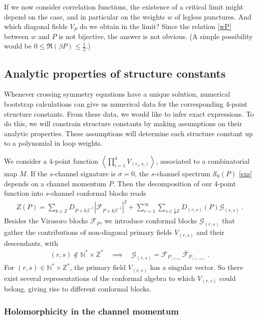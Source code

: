 \documentclass[12pt, a4paper]{article}
\begin{document}
If we now consider correlation functions, the existence of a critical limit might depend on the case, and in particular on the weights $w$ of legless punctures. And which diagonal fields $V_P$ do we obtain in the limit? Since the relation \eqref{wP} between $w$ and $P$ is not bijective, the answer is not obvious. (A simple possibility would be $0\leq \Re(\beta P)\leq \frac12$.) 


\subsection{Analytic properties of structure constants}

Whenever crossing symmetry equations have a unique solution, numerical bootstrap calculations can give us numerical data for the corresponding 4-point structure constants. From these data, we would like to infer exact expressions. To do this, we will constrain structure constants by making assumptions on their analytic properties. These assumptions will determine each structure constant up to a polynomial in loop weights.

We consider a 4-point function $\left<\prod_{i=1}^4 V_{(r_i,s_i)}\right>$, associated to a combinatorial map $M$. If the $s$-channel signature is $\sigma=0$, the $s$-channel spectrum $\mathcal{S}_0(P)$ \eqref{sxs} depends on a channel momentum $P$. Then the decomposition of our 4-point function into $s$-channel conformal blocks reads
\begin{align}
 Z(P) =  \sum_{k\in\mathbb{Z}} D_{P+k\beta^{-1}} \left|\mathcal{F}_{P+k\beta^{-1}}\right|^2 +\sum_{r=1}^\infty \sum_{s\in\frac{1}{r}\mathbb{Z}} D_{(r,s)}(P) \mathcal{G}_{(r,s)}\ .
 \label{zop}
\end{align}
Besides the Virasoro blocks $\mathcal{F}_P$, we introduce conformal blocks $\mathcal{G}_{(r,s)}$ that gather the contributions of non-diagonal primary fields $V_{(r,s)}$ and their descendants, with
\begin{align}
 (r,s)\notin\mathbb{N}^*\times \mathbb{Z}^*\quad \implies\quad \mathcal{G}_{(r,s)} = \mathcal{F}_{P_{(r,s)}}\bar{\mathcal{F}}_{P_{(r,-s)}}\ .
\end{align}
For $(r,s)\in\mathbb{N}^*\times \mathbb{Z}^*$, the primary field $V_{(r,s)}$ has a singular vector. So there exist several representations of the conformal algebra to which $V_{(r,s)}$ could belong, giving rise to different conformal blocks.

\subsubsection{Holomorphicity in the channel momentum}\label{sec:hcm}
\end{document}
